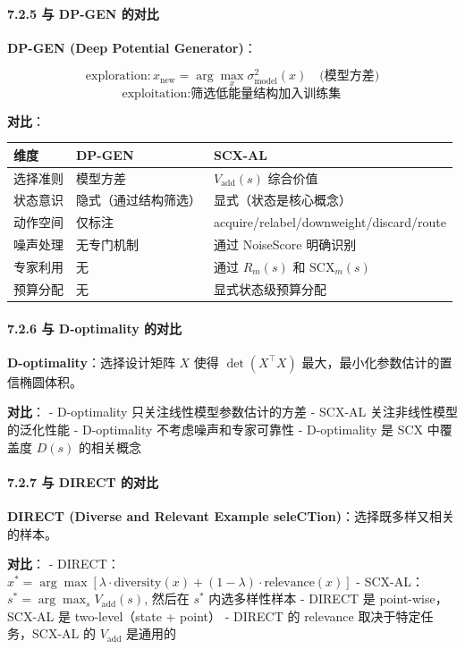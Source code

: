 \documentclass[
  12pt,
]{ctexart}
\begin{document}
\paragraph{7.2.5 与 DP-GEN
的对比}\label{ux4e0e-dp-gen-ux7684ux5bf9ux6bd4}

\textbf{DP-GEN (Deep Potential Generator)}：

\[
\text{exploration}: x_{\text{new}} = \arg\max_x \sigma^2_{\text{model}}(x) \quad \text{(模型方差)}
\] \[
\text{exploitation}: \text{筛选低能量结构加入训练集}
\]

\textbf{对比}：

\begin{longtable}[]{@{}lll@{}}
\toprule\noalign{}
维度 & DP-GEN & SCX-AL \\
\midrule\noalign{}
\endhead
\bottomrule\noalign{}
\endlastfoot
选择准则 & 模型方差 & \(V_{\text{add}}(s)\) 综合价值 \\
状态意识 & 隐式（通过结构筛选） & 显式（状态是核心概念） \\
动作空间 & 仅标注 & acquire/relabel/downweight/discard/route \\
噪声处理 & 无专门机制 & 通过 NoiseScore 明确识别 \\
专家利用 & 无 & 通过 \(R_m(s)\) 和 \(\text{SCX}_m(s)\) \\
预算分配 & 无 & 显式状态级预算分配 \\
\end{longtable}

\paragraph{7.2.6 与 D-optimality
的对比}\label{ux4e0e-d-optimality-ux7684ux5bf9ux6bd4}

\textbf{D-optimality}：选择设计矩阵 \(X\) 使得 \(\det(X^\top X)\)
最大，最小化参数估计的置信椭圆体积。

\textbf{对比}： - D-optimality 只关注线性模型参数估计的方差 - SCX-AL
关注非线性模型的泛化性能 - D-optimality 不考虑噪声和专家可靠性 -
D-optimality 是 SCX 中覆盖度 \(D(s)\) 的相关概念

\paragraph{7.2.7 与 DIRECT
的对比}\label{ux4e0e-direct-ux7684ux5bf9ux6bd4}

\textbf{DIRECT (Diverse and Relevant Example
seleCTion)}：选择既多样又相关的样本。

\textbf{对比}： -
DIRECT：\(x^* = \arg\max [\lambda \cdot \text{diversity}(x) + (1-\lambda) \cdot \text{relevance}(x)]\)
- SCX-AL：\(s^* = \arg\max_s V_{\text{add}}(s)\), 然后在 \(s^*\)
内选多样性样本 - DIRECT 是 point-wise，SCX-AL 是 two-level（state +
point） - DIRECT 的 relevance 取决于特定任务，SCX-AL 的
\(V_{\text{add}}\) 是通用的
\end{document}

